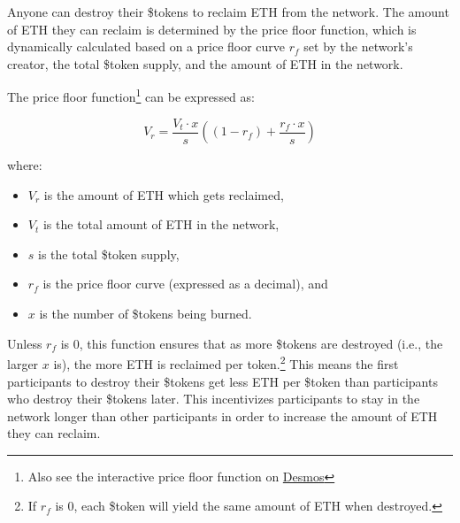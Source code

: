 \documentclass{article}
\begin{document}
Anyone can destroy their \$tokens to reclaim ETH from the network. The amount of ETH they can reclaim is determined by the price floor function, which is dynamically calculated based on a price floor curve $r_f$ set by the network's creator, the total \$token supply, and the amount of ETH in the network.

The price floor function\footnote{Also see the interactive price floor function on \href{https://www.desmos.com/calculator/9pewqesyj5}{Desmos}} can be expressed as:

\begin{equation}
  V_r = \frac{V_t \cdot x}{s}\left(\left(1-r_f\right)+\frac{r_f \cdot x}{s}\right)
\end{equation}

where:
\begin{itemize}
  \item $V_r$ is the amount of ETH which gets reclaimed,
  \item $V_t$ is the total amount of ETH in the network,
  \item $s$ is the total \$token supply,
  \item $r_f$ is the price floor curve (expressed as a decimal), and
  \item $x$ is the number of \$tokens being burned.
\end{itemize}

Unless $r_f$ is 0, this function ensures that as more \$tokens are destroyed (i.e., the larger $x$ is), the more ETH is reclaimed per token.\footnote{If $r_f$ is 0, each \$token will yield the same amount of ETH when destroyed.} This means the first participants to destroy their \$tokens get less ETH per \$token than participants who destroy their \$tokens later. This incentivizes participants to stay in the network longer than other participants in order to increase the amount of ETH they can reclaim.
\end{document}

